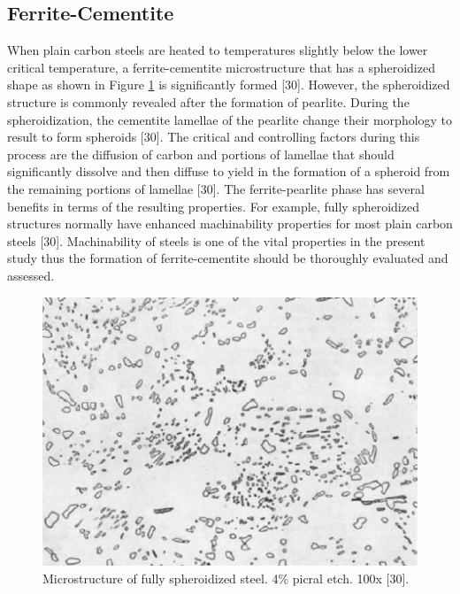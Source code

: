 \documentclass[12pt]{report}
\begin{document}
\subsection{Ferrite-Cementite}
When plain carbon steels are heated to temperatures slightly below the lower critical temperature, a ferrite-cementite microstructure that has a spheroidized shape as shown in Figure \ref{ch3:figure:spheroidized_steel} is significantly formed [30]. However, the spheroidized structure is commonly revealed after the formation of pearlite. During the spheroidization, the cementite lamellae of the pearlite change their morphology to result to form spheroids [30].
The critical and controlling factors during this process are the diffusion of carbon and portions of lamellae that should significantly dissolve and then diffuse to yield in the formation of a spheroid from the remaining portions of lamellae [30]. The ferrite-pearlite phase has several benefits in terms of the resulting properties. For example, fully spheroidized structures normally have enhanced machinability properties for most plain carbon steels [30].  Machinability of steels is one of the vital properties in the present study thus the formation of ferrite-cementite should be thoroughly evaluated and assessed.

\begin{figure}[H]
    \centering
    \includegraphics[width=.55\textwidth]{microstructure_of_fully_spheroidizel_steel.jpg}
    \caption{Microstructure of fully spheroidized steel. 4\% picral etch. 100x [30].}
    \label{ch3:figure:spheroidized_steel}
\end{figure}
\end{document}
